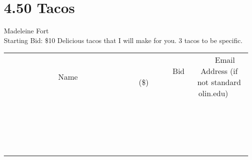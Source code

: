 \documentclass[11pt]{article}
\begin{document}
\section*{4.50 Tacos}
Madeleine Fort
\\
Starting Bid: \$10
\newline
Delicious tacos that I will make for you.  3 tacos to be specific.
\\[3ex]
\begin{tabular}{c c c}
~~~~~~~~~~~~~Name~~~~~~~~~~~~~ & ~~~~~~~~~Bid (\$)~~~~~~~~~  & ~~~Email Address (if not standard olin.edu)~~~\\
 & & \\
\hline
 & & \\
\hline
 & & \\
\hline
 & & \\
\hline
 & & \\
\hline
 & & \\
\hline
 & & \\
\hline
 & & \\
\hline
 & & \\
\hline
 & & \\
\hline
 & & \\
\hline
 & & \\
\hline
 & & \\
\hline
 & & \\
\hline
 & & \\
\hline
 & & \\
\hline
 & & \\
\hline
 & & \\
\hline
 & & \\
\hline
\end{tabular}
\newpage
\end{document}
